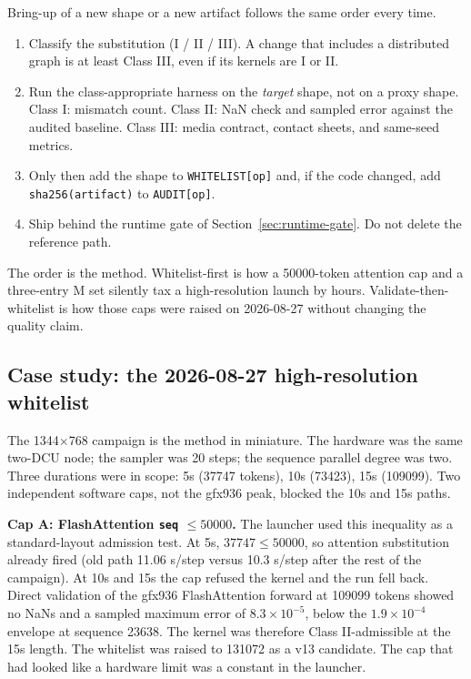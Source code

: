 \documentclass[11pt]{article}
\begin{document}
Bring-up of a new shape or a new artifact follows the same order every time.

\begin{enumerate}
\item Classify the substitution (I / II / III). A change that includes a distributed graph is at least Class III, even if its kernels are I or II.
\item Run the class-appropriate harness on the \emph{target} shape, not on a proxy shape. Class I: mismatch count. Class II: NaN check and sampled error against the audited baseline. Class III: media contract, contact sheets, and same-seed metrics.
\item Only then add the shape to \texttt{WHITELIST[op]} and, if the code changed, add \texttt{sha256(artifact)} to \texttt{AUDIT[op]}.
\item Ship behind the runtime gate of Section~\ref{sec:runtime-gate}. Do not delete the reference path.
\end{enumerate}

The order is the method. Whitelist-first is how a 50000-token attention cap and a three-entry M set silently tax a high-resolution launch by hours. Validate-then-whitelist is how those caps were raised on 2026-08-27 without changing the quality claim.

\subsection{Case study: the 2026-08-27 high-resolution whitelist}
\label{sec:casestudy}

The 1344$\times$768 campaign is the method in miniature. The hardware was the same two-DCU node; the sampler was 20 steps; the sequence parallel degree was two. Three durations were in scope: 5s (37747 tokens), 10s (73423), 15s (109099). Two independent software caps, not the gfx936 peak, blocked the 10s and 15s paths.

\textbf{Cap A: FlashAttention \texttt{seq} $\leq 50000$.} The launcher used this inequality as a standard-layout admission test. At 5s, $37747 \leq 50000$, so attention substitution already fired (old path 11.06 s/step versus 10.3 s/step after the rest of the campaign). At 10s and 15s the cap refused the kernel and the run fell back. Direct validation of the gfx936 FlashAttention forward at 109099 tokens showed no NaNs and a sampled maximum error of $8.3\times 10^{-5}$, below the $1.9\times 10^{-4}$ envelope at sequence 23638. The kernel was therefore Class II-admissible at the 15s length. The whitelist was raised to 131072 as a v13 candidate. The cap that had looked like a hardware limit was a constant in the launcher.
\end{document}
